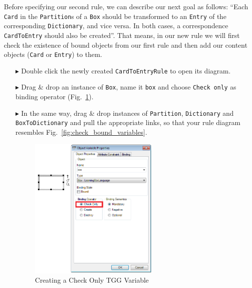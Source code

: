 Before specifying our second rule, we can describe our next goal as follows: ``Each \texttt{Card} in the \texttt{Partition}s of a \texttt{Box} should be transformed to an \texttt{Entry} of the corresponding \texttt{Dictionary}, and vice versa. 
In both cases, a correspondence \texttt{CardToEntry} should also be created''. 
That means, in our new rule we will first check the existence of bound objects from our first rule and then add our content objects (\texttt{Card} or \texttt{Entry}) to them.

\begin{enumerate}
\item[$\blacktriangleright$] Double click the newly created \texttt{CardToEntryRule} to open its diagram.
\item[$\blacktriangleright$] Drag \& drop an instance of \texttt{Box}, name it \texttt{box} and choose \texttt{Check only} as binding operator (Fig.~\ref{fig:bound_tgg_variable}).
\item[$\blacktriangleright$] In the same way, drag \& drop instances of \texttt{Partition}, \texttt{Dictionary} and \texttt{BoxToDictionary} and pull the appropriate links, so that your rule diagram resembles Fig.~\ref{fig:check_bound_variables}.

\begin{figure}[htbp]
\begin{center}
  \includegraphics[width=0.6\textwidth]{pics/tggBilder/tggRule/tgg17}
  \caption{Creating a Check Only TGG Variable}  
  \label{fig:bound_tgg_variable}
\end{center}
\end{figure}


\end{enumerate}
